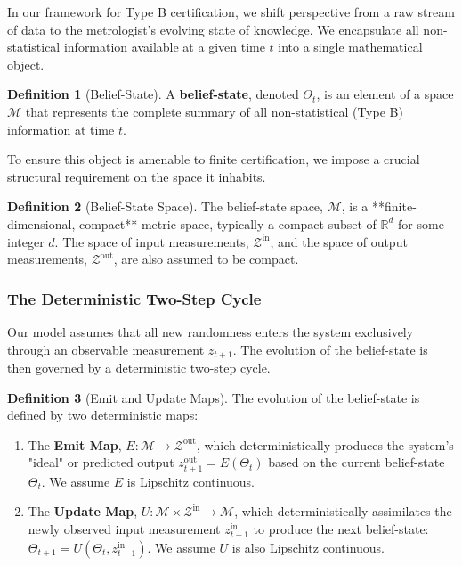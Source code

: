 \documentclass{article}
\theoremstyle{definition}
\newtheorem{definition}{Definition}[section]
\theoremstyle{plain}
\begin{document}
In our framework for Type B certification, we shift perspective from a raw stream of data to the metrologist's evolving state of knowledge. We encapsulate all non-statistical information available at a given time $t$ into a single mathematical object.

\begin{definition}[Belief-State]
A \textbf{belief-state}, denoted $\Theta_t$, is an element of a space $\mathcal{M}$ that represents the complete summary of all non-statistical (Type B) information at time $t$. 
\end{definition}

To ensure this object is amenable to finite certification, we impose a crucial structural requirement on the space it inhabits.

\begin{definition}[Belief-State Space]
The belief-state space, $\mathcal{M}$, is a **finite-dimensional, compact** metric space, typically a compact subset of $\mathbb{R}^d$ for some integer $d$. The space of input measurements, $\mathcal{Z}^{\text{in}}$, and the space of output measurements, $\mathcal{Z}^{\text{out}}$, are also assumed to be compact.
\end{definition}


\subsubsection{The Deterministic Two-Step Cycle}

Our model assumes that all new randomness enters the system exclusively through an observable measurement $z_{t+1}$. The evolution of the belief-state is then governed by a deterministic two-step cycle.

\begin{definition}[Emit and Update Maps]
The evolution of the belief-state is defined by two deterministic maps:
\begin{enumerate}
    \item The \textbf{Emit Map}, $E: \mathcal{M} \to \mathcal{Z}^{\text{out}}$, which deterministically produces the system's "ideal" or predicted output $z^{\text{out}}_{t+1} = E(\Theta_t)$ based on the current belief-state $\Theta_t$. We assume $E$ is Lipschitz continuous.
    \item The \textbf{Update Map}, $U: \mathcal{M} \times \mathcal{Z}^{\text{in}} \to \mathcal{M}$, which deterministically assimilates the newly observed input measurement $z^{\text{in}}_{t+1}$ to produce the next belief-state: $\Theta_{t+1} = U(\Theta_t, z^{\text{in}}_{t+1})$. We assume $U$ is also Lipschitz continuous.
\end{enumerate}
\end{definition}
\end{document}
